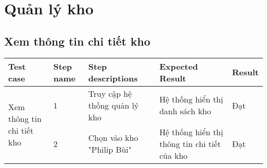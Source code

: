 
\section{Quản lý kho}
\subsection{ Xem thông tin chi tiết kho}
{
    \setlength\extrarowheight{6pt}
    \begin{longtable}{| p{2.5cm}| p{1cm}| p{5.5cm}| p{4.5cm} | p{1.5cm} |}
        \hline
        \textbf{Test case} & \textbf{Step name} & \textbf{Step descriptions} & \textbf{Expected Result} & \textbf{Result} \\
        \hline
        \multirow[t]{2}{2.5cm}{ Xem thông tin chi tiết kho} & 1 & Truy cập hệ thống quản lý kho & Hệ thống hiển thị danh sách kho & Đạt \\
        \cline{2-5}
         & 2 & Chọn vào kho "Philip Bùi" & Hệ thống hiển thị thông tin chi tiết của kho & Đạt \\
         \hline
    \end{longtable}
}

